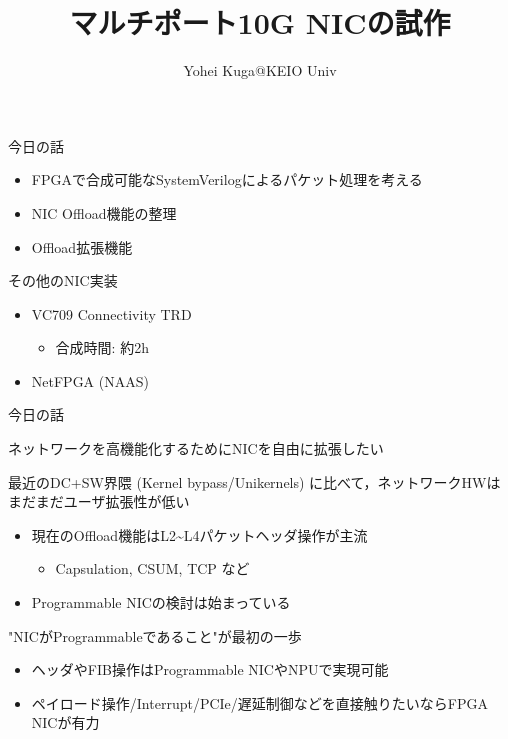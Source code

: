 \documentclass[10pt, compress]{beamer}
\title{マルチポート10G NICの試作}
\subtitle{}
\author{Yohei Kuga@KEIO Univ}
\institute{高速PCルータ研究会 2015/5}
\begin{document}
\maketitle


\begin{frame}[fragile,t]{今日の話}
\begin{itemize}
\item FPGAで合成可能なSystemVerilogによるパケット処理を考える
\item NIC Offload機能の整理
\item Offload拡張機能
\end{itemize}
\end{frame}


\begin{frame}[fragile,t]{その他のNIC実装}
\begin{itemize}
	\item VC709 Connectivity TRD
	\begin{itemize}
		\item 合成時間: 約2h
	\end{itemize}
	\item NetFPGA (NAAS)
\end{itemize}
\end{frame}


\begin{frame}[fragile,t]{今日の話}

ネットワークを高機能化するためにNICを自由に拡張したい
\vspace{.5em}

最近のDC+SW界隈 (Kernel bypass/Unikernels) に比べて，ネットワークHWはまだまだユーザ拡張性が低い
\vspace{-.5em}
\begin{itemize}
\item 現在のOffload機能はL2\~{}L4パケットヘッダ操作が主流
    \begin{itemize}
        \item Capsulation, CSUM, TCP など
    \end{itemize}
\item Programmable NICの検討は始まっている
\end{itemize}
\vspace{.5em}

"NICがProgrammableであること"が最初の一歩
\vspace{-.5em}
\begin{itemize}
\item ヘッダやFIB操作はProgrammable NICやNPUで実現可能
\item ペイロード操作/Interrupt/PCIe/遅延制御などを直接触りたいならFPGA NICが有力
\end{itemize}

\end{frame}
\end{document}
